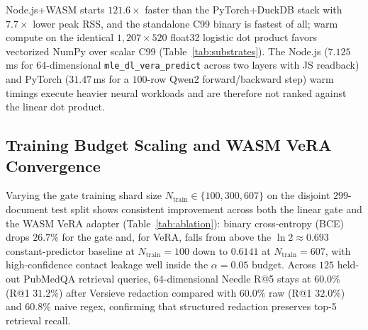 \documentclass{article}
\begin{document}
\begin{table}[t]
\caption{Median of $7$ interleaved OS process spawns. Process startup and peak RSS are directly comparable across all rows; warm compute compares the shared $1{,}207{\times}520$ logistic kernel only between C99 and NumPy.}
\label{tab:substrates}
\vskip 0.08in
\begin{center}
\end{center}
\vskip -0.14in
\end{table}

Node.js+WASM starts $121.6\times$ faster than the PyTorch+DuckDB stack with $7.7\times$ lower peak RSS, and the standalone C99 binary is fastest of all; warm compute on the identical $1{,}207{\times}520$ float32 logistic dot product favors vectorized NumPy over scalar C99 (Table~\ref{tab:substrates}). The Node.js ($7.125$\,ms for 64-dimensional \texttt{mle\_dl\_vera\_predict} across two layers with JS readback) and PyTorch ($31.47$\,ms for a $100$-row Qwen2 forward/backward step) warm timings execute heavier neural workloads and are therefore not ranked against the linear dot product.

\subsection{Training Budget Scaling and WASM VeRA Convergence}
Varying the gate training shard size $N_{\text{train}} \in \{100, 300, 607\}$ on the disjoint $299$-document test split shows consistent improvement across both the linear gate and the WASM VeRA adapter (Table~\ref{tab:ablation}): binary cross-entropy (BCE) drops $26.7\%$ for the gate and, for VeRA, falls from above the $\ln 2 \approx 0.693$ constant-predictor baseline at $N_{\text{train}}=100$ down to $0.6141$ at $N_{\text{train}}=607$, with high-confidence contact leakage well inside the $\alpha=0.05$ budget. Across $125$ held-out PubMedQA retrieval queries, 64-dimensional Needle R@5 stays at $60.0\%$ (R@1 $31.2\%$) after Versieve redaction compared with $60.0\%$ raw (R@1 $32.0\%$) and $60.8\%$ naive regex, confirming that structured redaction preserves top-5 retrieval recall.
\end{document}
